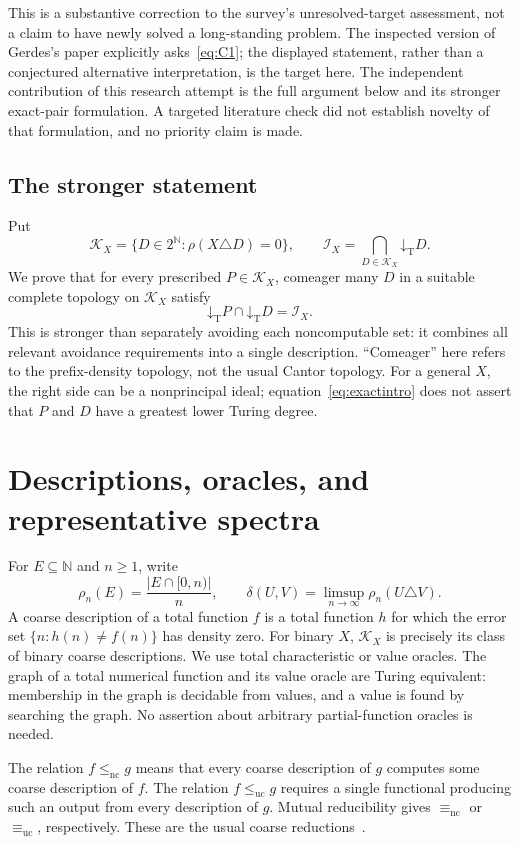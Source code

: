 \documentclass[11pt,a4paper]{article}
\newcommand{\N}{\mathbb N}
\newcommand{\Cantor}{2^{\N}}
\newcommand{\lenc}{\leq_{\mathrm{nc}}}
\newcommand{\leuc}{\leq_{\mathrm{uc}}}
\newcommand{\eqnc}{\equiv_{\mathrm{nc}}}
\newcommand{\equc}{\equiv_{\mathrm{uc}}}
\newcommand{\Core}{\mathcal I}
\newcommand{\low}[1]{\mathord{\downarrow}_{\mathrm T}#1}
\theoremstyle{definition}\newtheorem{definition}[theorem]{Definition}
\theoremstyle{remark}\newtheorem{remark}[theorem]{Remark}
\begin{document}
This is a substantive correction to the survey's unresolved-target assessment, not a claim to have newly solved a long-standing problem. The inspected version of Gerdes's paper explicitly asks~\eqref{eq:C1}; the displayed statement, rather than a conjectured alternative interpretation, is the target here. The independent contribution of this research attempt is the full argument below and its stronger exact-pair formulation. A targeted literature check did not establish novelty of that formulation, and no priority claim is made.

\subsection{The stronger statement}
Put
\[
 \mathcal K_X=\{D\in\Cantor:\rho(X\triangle D)=0\},
 \qquad
 \Core_X=\bigcap_{D\in\mathcal K_X}\low D.
\]
We prove that for every prescribed $P\in\mathcal K_X$, comeager many $D$ in a suitable complete topology on $\mathcal K_X$ satisfy
\begin{equation}
                 \low P\cap\low D=\Core_X.
                 \label{eq:exactintro}
\end{equation}
This is stronger than separately avoiding each noncomputable set: it combines all relevant avoidance requirements into a single description. ``Comeager'' here refers to the prefix-density topology, not the usual Cantor topology. For a general $X$, the right side can be a nonprincipal ideal; equation~\eqref{eq:exactintro} does not assert that $P$ and $D$ have a greatest lower Turing degree.

\section{Descriptions, oracles, and representative spectra}
\label{sec:defs}
For $E\subseteq\N$ and $n\ge1$, write
\[
 \rho_n(E)=\frac{|E\cap[0,n)|}{n},\qquad
 \delta(U,V)=\limsup_{n\to\infty}\rho_n(U\triangle V).
\]
A coarse description of a total function $f$ is a total function $h$ for which the error set $\{n:h(n)\ne f(n)\}$ has density zero. For binary $X$, $\mathcal K_X$ is precisely its class of binary coarse descriptions. We use total characteristic or value oracles. The graph of a total numerical function and its value oracle are Turing equivalent: membership in the graph is decidable from values, and a value is found by searching the graph. No assertion about arbitrary partial-function oracles is needed.

The relation $f\lenc g$ means that every coarse description of $g$ computes some coarse description of $f$. The relation $f\leuc g$ requires a single functional producing such an output from every description of $g$. Mutual reducibility gives $\eqnc$ or $\equc$, respectively. These are the usual coarse reductions~\cite{Gerdes,HJKS}.
\end{document}
